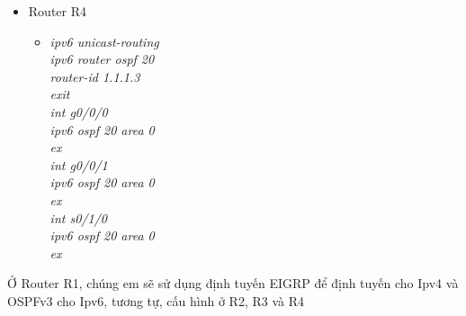 \documentclass[a4paper, 12pt]{article}
\begin{document}
\begin{itemize}
\begin{itemize}
\begin{itemize}
          \end{itemize}
             \item Router R4
           
        \begin{itemize}
         \item \textit{ipv6 unicast-routing\\
                        ipv6 router ospf 20\\
                        router-id 1.1.1.3\\
                        exit\\
                        int g0/0/0\\
                        ipv6 ospf 20 area 0\\
                        ex\\
                        int g0/0/1\\
                        ipv6 ospf 20 area 0\\
                        ex\\
                        int s0/1/0\\
                        ipv6 ospf 20 area 0\\
                        ex\\}
        
          \end{itemize}
       \end{itemize}
       \hspace*{0.25cm} Ở Router R1, chúng em sẽ sử dụng định tuyến EIGRP để định tuyến cho Ipv4 và OSPFv3 cho Ipv6, tương tự, cấu hình ở R2, R3 và R4\\
\end{itemize}
\end{document}
